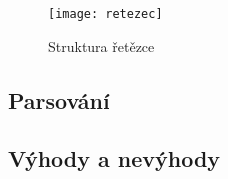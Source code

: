\begin{figure}[!htb]
\centering
\texttt{[image: retezec]}
\caption{Struktura řetězce}
\label{retezec}
\end{figure}

\subsection{Parsování}
\subsection{Výhody a nevýhody}